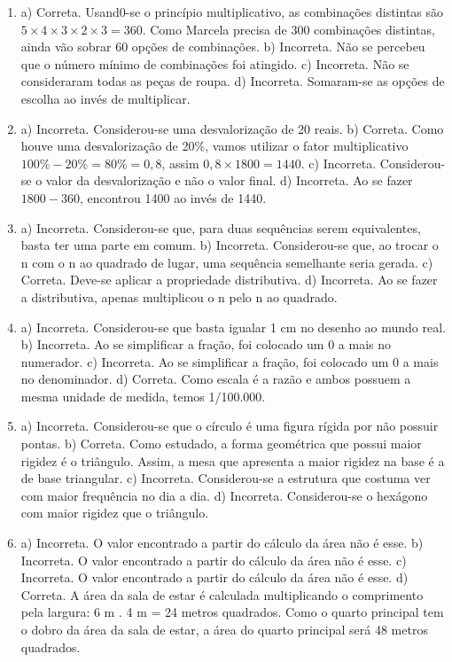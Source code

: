 \begin{enumerate}
\item a) Correta. Usand0-se o princípio multiplicativo, as combinações
distintas são $5 \times 4 \times 3 \times 2 \times 3 = 360$. Como Marcela precisa de 300 combinações distintas, ainda vão sobrar 60 opções de combinações.
b) Incorreta. Não se percebeu que o número mínimo de combinações foi atingido.
c) Incorreta. Não se consideraram todas as peças de roupa.
d) Incorreta. Somaram-se as opções de escolha ao invés de multiplicar.


\item a) Incorreta. Considerou-se uma desvalorização de 20 reais.
b) Correta. Como houve uma desvalorização de 20\%, vamos utilizar
o fator multiplicativo $100\% - 20\% = 80\% = 0,8$, assim $0,8 \times 1800 = 1440$.
c) Incorreta. Considerou-se o valor da desvalorização e não o valor final.
d) Incorreta. Ao se fazer $1800 - 360$, encontrou 1400 ao invés de 1440.


\item a) Incorreta. Considerou-se que, para duas sequências serem equivalentes, basta ter uma parte em comum.
b) Incorreta. Considerou-se que, ao trocar o n com o n ao quadrado de lugar, uma sequência semelhante seria gerada.
c) Correta. Deve-se aplicar a propriedade distributiva.
d) Incorreta. Ao se fazer a distributiva, apenas multiplicou o n pelo n ao quadrado.

\item a) Incorreta. Considerou-se que basta igualar 1 cm no desenho ao mundo real.
b) Incorreta. Ao se simplificar a fração, foi colocado um 0 a mais no numerador.
c) Incorreta. Ao se simplificar a fração, foi colocado um 0 a mais no denominador.
d) Correta. Como escala é a razão e ambos possuem a mesma unidade de medida,
temos 1/100.000.


\item a) Incorreta. Considerou-se que o círculo é uma figura rígida por não possuir pontas.
b) Correta. Como estudado, a forma geométrica que possui maior rigidez é o triângulo. Assim, a mesa que apresenta a maior rigidez na base é a de base triangular.
c) Incorreta. Considerou-se a estrutura que costuma ver com maior frequência no dia a dia.
d) Incorreta. Considerou-se o hexágono com maior rigidez que o triângulo.

\item a) Incorreta. O valor encontrado a partir do cálculo da área não é esse.
b) Incorreta. O valor encontrado a partir do cálculo da área não é esse.
c) Incorreta. O valor encontrado a partir do cálculo da área não é
esse.
d) Correta. A área da sala de estar é calculada multiplicando o comprimento pela largura:
6 m . 4 m = 24 metros quadrados. Como o quarto principal
tem o dobro da área da sala de estar, a área do quarto principal será 48 metros quadrados.


\end{enumerate}
